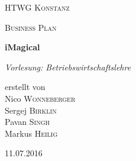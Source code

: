 \begin{titlepage}
	\centering
	{\scshape\LARGE HTWG Konstanz \par}
	\vspace{1cm}
	{\scshape\Large Business Plan\par}
	\vspace{1.5cm}
	{\huge\bfseries iMagical\par}
	\vspace{2cm}
	{\Large\itshape Vorlesung: Betriebswirtschaftslehre\par}
	\vfill
	erstellt von \\
	\vspace{0.5cm}
	Nico \textsc{Wonneberger} \\
	Sergej \textsc{Birklin} \\
	Pavan \textsc{Singh} \\
	Markus \textsc{Heilig}
	\vfill

	{\large 11.07.2016\par}
\end{titlepage}